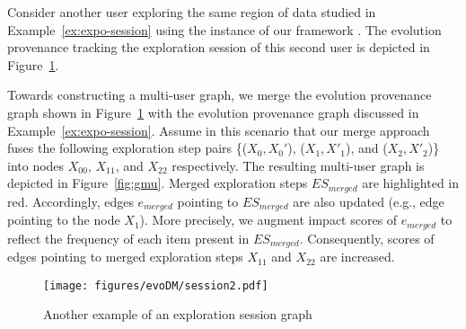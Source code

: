 \begin{example}
\label{ex:multi-userG}
Consider another user exploring the same region of data studied in Example~\ref{ex:expo-session} using \prototype{} the instance of our framework \framework{}. The evolution provenance tracking the exploration session of this second user is depicted in Figure~\ref{fig:session2}.

Towards constructing a multi-user graph, we merge the evolution provenance graph shown in Figure~\ref{fig:session2} with the evolution provenance graph discussed in Example~\ref{ex:expo-session}. Assume in this scenario that our merge approach fuses the following exploration step pairs \{($X_0,X_0'$), ($X_{1},X'_{1}$), and ($X_{2},X'_{2}$)\} into nodes $X_{00}$, $X_{11}$, and $X_{22}$ respectively.
The resulting multi-user graph is depicted in Figure~\ref{fig:gmu}.
Merged exploration steps $ES_{merged}$ are highlighted in red.
Accordingly, edges $e_{merged}$ pointing to $ES_{merged}$ are also updated (e.g., edge pointing to the node $X_1$). More precisely, we augment impact scores of $e_{merged}$ to reflect the frequency of each item present in $ES_{merged}$. Consequently, scores of edges pointing to merged exploration steps   $X_{11}$ and $X_{22}$ are increased. 
\end{example}
\begin{figure}[t]
\centering
\texttt{[image: figures/evoDM/session2.pdf]}
\caption{Another example of an exploration session graph}
\label{fig:session2}
\end{figure}


